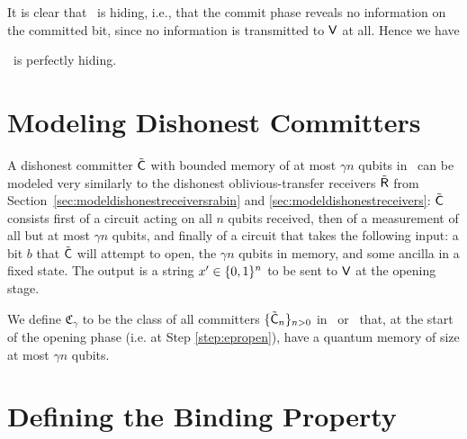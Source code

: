 It is clear that \eprcomm\ is hiding, i.e., that the commit phase
reveals no information on the committed bit, since no information is
transmitted to ${\sf V}$ at all. Hence we have
\begin{lemma}\label{lem:sec:hiding}
\eprcomm\ is perfectly hiding.
\end{lemma}



\section{Modeling Dishonest Committers}\label{sec:dishonestcomm}
 A dishonest committer $\tilde{\sf C}$ with bounded
memory of at most $\gamma n$ qubits in \eprcomm\ can be modeled very
similarly to the dishonest oblivious-transfer receivers $\tilde{\sf R}$ from
Section~\ref{sec:modeldishonestreceiversrabin} and
\ref{sec:modeldishonestreceivers}: $\tilde{\sf C}$ consists first of a circuit
acting on all $n$ qubits received, then of a measurement of all but at
most $\gamma n$ qubits, and finally of a circuit that takes the
following input: a bit $b$ that $\tilde{\sf C}$ will attempt to open, the
$\gamma n$ qubits in memory, and some ancilla in a fixed state. The
output is a string $x' \in \{0,1\}^n$ to be sent to ${\sf V}$ at the opening
stage.
\begin{definition}
  We define $\mathfrak{C}_{\gamma}$ to be the class of all committers
  $\{\tilde{\sf C}_n\}_{n>0}$ in \comm\ or \eprcomm\ that, at the start of the opening phase
  (i.e. at Step \ref{step:epropen}), have a quantum memory of size at most
  $\gamma n$ qubits.
\end{definition}

\section{Defining the Binding Property} \label{sec:defbinding}
